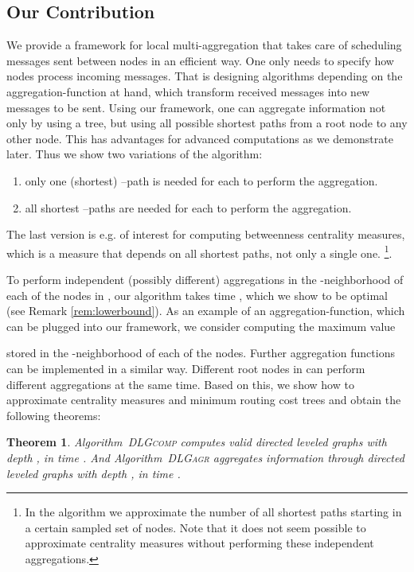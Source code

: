 \documentclass[11pt]{article}
\newtheorem{theorem}{Theorem}[section]
\newcommand{\todoI}[1]{}\newcommand{\blueI}[1]{}
\newif\iffull
\begin{document}
\subsection{Our Contribution}
We provide a framework for local multi-aggregation that takes care of scheduling messages sent between nodes in an efficient way. One only needs to specify how nodes process incoming messages. That is designing algorithms depending on the aggregation-function at hand, which transform received messages into new messages to be sent. Using our framework, one can aggregate information not only by using a tree, but using all possible shortest paths from a root node to any other node. This has advantages for advanced computations as we demonstrate later. Thus we show two variations of the algorithm:
\begin{enumerate}
\item only one (shortest) --path is needed for each  to perform the aggregation.
\item all shortest --paths are needed for each  to perform the aggregation.
\end{enumerate}
The last version is e.g. of interest for computing betweenness centrality measures, which is a measure that depends on all shortest paths, not only a single one. \footnote{In the algorithm we approximate the number of all shortest paths starting in a certain sampled set  of nodes. Note that it does not seem possible to approximate centrality measures without performing these  independent aggregations.}. 

To perform  independent (possibly different) aggregations in the -neighborhood of each of the nodes in , our algorithm takes time , which we show to be optimal (see Remark \ref{rem:lowerbound}). As an example of an aggregation-function, which can be plugged into our framework, we consider computing the maximum value
\todoI{more fkt.}
stored in the -neighborhood of each of the  nodes. Further aggregation functions can be implemented in a similar way. Different root nodes in  can perform different aggregations at the same time. Based on this, we show how to approximate centrality measures and minimum routing cost trees and obtain the following theorems:

\begin{theorem}\label{theo:DLGruntime}
Algorithm\iffull~\ref{alg:DLGcomp}\fi~\textsc{DLGcomp} computes  valid directed leveled graphs with depth , in time . And Algorithm\iffull~\ref{alg:DLGagr}\fi~\textsc{DLGagr} aggregates information through  directed leveled graphs with depth , in time .
\end{theorem}
\end{document}
